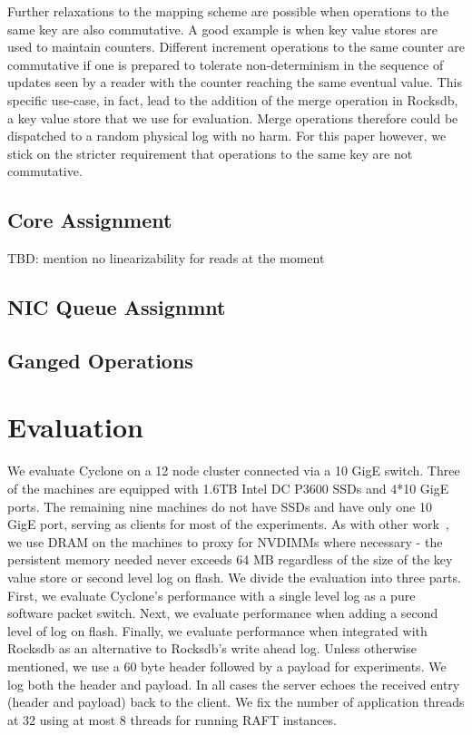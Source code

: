 \documentclass[10pt, preprint, nonatbib]{sigplanconf}
\begin{document}
Further relaxations to the mapping scheme are possible when operations to the
same key are also commutative. A good example is when key value stores are used
to maintain counters. Different increment operations to the same counter are
commutative if one is prepared to tolerate non-determinism in the sequence of
updates seen by a reader with the counter reaching the same eventual value. This
specific use-case, in fact, lead to the addition of the merge operation in
Rocksdb, a key value store that we use for evaluation. Merge operations
therefore could be dispatched to a random physical log with no harm. For this
paper however, we stick on the stricter requirement that operations to the same
key are not commutative.

\subsection{Core Assignment}

TBD: mention no linearizability for reads at the moment

\subsection{NIC Queue Assignmnt}

\subsection{Ganged Operations}

\section{Evaluation}
We evaluate Cyclone on a 12 node cluster connected via a 10 GigE switch. Three
of the machines are equipped with 1.6TB Intel DC P3600 SSDs and 4*10 GigE
ports. The remaining nine machines do not have SSDs and have only one 10 GigE
port, serving as clients for most of the experiments. As with other
work~\cite{faast}, we use DRAM on the machines to proxy for NVDIMMs where
necessary - the persistent memory needed never exceeds 64 MB regardless of the
size of the key value store or second level log on flash. We divide the
evaluation into three parts. First, we evaluate Cyclone's performance with a
single level log as a pure software packet switch. Next, we evaluate performance
when adding a second level of log on flash. Finally, we evaluate performance
when integrated with Rocksdb as an alternative to Rocksdb's write ahead
log. Unless otherwise mentioned, we use a 60 byte header followed by a payload
for experiments. We log both the header and payload. In all cases the server
echoes the received entry (header and payload) back to the client. We fix the
number of application threads at 32 using at most 8 threads for running RAFT
instances.
\end{document}
